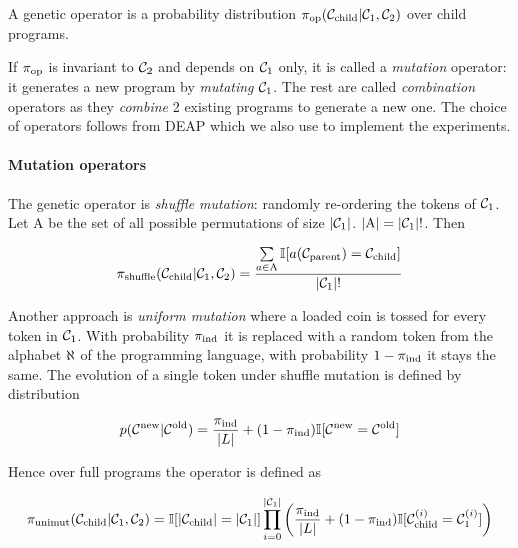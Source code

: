 A genetic operator is a probability distribution $\pi_\text{op}(\mathcal{C}_\text{child}|\mathcal{C}_1,\mathcal{C}_2)$ over child programs. 

If $\pi_\text{op}$ is invariant to $\mathcal{C}_2$ and depends on $\mathcal{C}_1$ only, it is called a \emph{mutation} operator: it generates a new program by \emph{mutating} $\mathcal{C}_1$.
The rest are called \emph{combination} operators as they \emph{combine} 2 existing programs to generate a new one.
The choice of operators follows from DEAP \cite{deap, derainvilleDEAPEnablingNimbler2014, derainvilleDEAPPythonFramework2012} which we also use to implement the experiments.

\paragraph{Mutation operators}

The genetic operator is \emph{shuffle mutation}: randomly re-ordering the tokens of $\mathcal{C}_1$.
Let $\mathrm{A}$ be the set of all possible permutations of size $|\mathcal{C}_1|$. $|\mathrm{A}|=|\mathcal{C}_1|!$. 
Then

\begin{equation}
    \pi_\text{shuffle}(\mathcal{C}_\text{child}|\mathcal{C}_1,\mathcal{C}_2) =
            \frac{\sum\limits_{a \in \mathrm{A}} \mathbb{I}[a(\mathcal{C}_\text{parent}) = \mathcal{C}_\text{child}]}{|\mathcal{C}_1|!}
\end{equation}

Another approach is \emph{uniform mutation} where a loaded coin is tossed for every token in $\mathcal{C}_1$. 
With probability $\pi_\text{ind}$ it is replaced with a random token from the alphabet $\aleph$ of the programming language, with probability $1-\pi_\text{ind}$ it stays the same.
The evolution of a single token under shuffle mutation is defined by distribution

\begin{equation}
    p(\mathcal{C}^\text{new} | \mathcal{C}^\text{old}) = \frac{\pi_\text{ind}}{|L|} +  (1 - \pi_\text{ind}) \mathbb{I}[\mathcal{C}^\text{new} = \mathcal{C}^\text{old}]
\end{equation}

Hence over full programs the operator is defined as

\begin{equation}
    \pi_\text{unimut}(\mathcal{C}_\text{child}|\mathcal{C}_1,\mathcal{C}_2) = \mathbb{I}[|\mathcal{C}_\text{child}|=|\mathcal{C}_1|] \\ 
    \prod\limits_{i=0}^{|\mathcal{C}_1|}  \left(\frac{\pi_\text{ind}}{|L|} +  (1 - \pi_\text{ind}) \mathbb{I}[\mathcal{C}_\text{child}^{(i)} = \mathcal{C}_1^{(i)}] \right)
\end{equation}

